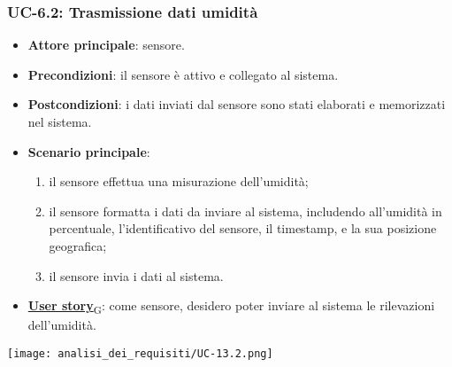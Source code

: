 \subsubsection{UC-6.2: Trasmissione dati umidità}
\begin{itemize}
	\item \textbf{Attore principale}: sensore.
	\item \textbf{Precondizioni}: il sensore è attivo e collegato al sistema.
	\item \textbf{Postcondizioni}: i dati inviati dal sensore sono stati elaborati e memorizzati nel sistema.
	\item \textbf{Scenario principale}:
	      \begin{enumerate}
		      \item il sensore effettua una misurazione dell'umidità;
		      \item il sensore formatta i dati da inviare al sistema, includendo all'umidità in percentuale, l'identificativo del sensore,
		            il timestamp, e la sua posizione geografica;
		      \item il sensore invia i dati al sistema.
	      \end{enumerate}
	\item \href{https://7last.github.io/docs/pb/documentazione-interna/glossario\#user-story}{\textbf{User story}\textsubscript{G}}: come sensore, desidero poter inviare al sistema le rilevazioni dell'umidità.
\end{itemize}

\begin{center}
	\texttt{[image: analisi\_dei\_requisiti/UC-13.2.png]}
\end{center}

